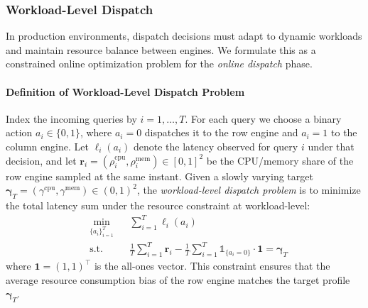 \documentclass[sigconf, nonacm]{acmart}
\begin{document}



\subsubsection{Workload-Level Dispatch}\label{sssec:online_dispatch}
In production environments, dispatch decisions must adapt to dynamic workloads and maintain resource balance between engines. We formulate this as a constrained online optimization problem for the \textit{online dispatch} phase.


\paragraph{Definition of Workload-Level Dispatch Problem}
Index the incoming queries by $i=1,\dots,T$. For each query we choose a binary action $a_i\in\{0,1\}$, where $a_i=0$ dispatches it to the row engine and $a_i=1$ to the column engine. Let $\ell_i(a_i)$ denote the latency observed for query $i$ under that decision, and let $\mathbf{r}_i=(\rho_i^{\text{cpu}},\rho_i^{\text{mem}})\in[0,1]^2$ be the CPU/memory share of the row engine sampled at the same instant. Given a slowly varying target $\boldsymbol{\gamma}_T=(\gamma^{\text{cpu}},\gamma^{\text{mem}})\in(0,1)^2$, the \emph{workload-level dispatch problem} is to minimize the total latency sum under the resource constraint at workload-level:
\begin{equation}
\begin{aligned}
  &\min_{\{a_i\}_{i=1}^T}
   &&\sum_{i=1}^{T}\ell_i(a_i)\\
  &\text{s.t.}
   &&\frac{1}{T}\sum_{i=1}^T\mathbf{r}_i
      -\frac{1}{T}\sum_{i=1}^T
        \mathds{1}_{\{a_i=0\}} \cdot \mathbf{1}
      =\boldsymbol{\gamma}_T
\end{aligned}
\label{eq:online_obj_query}
\end{equation}
where $\mathbf{1}=(1,1)^\top$ is the all-ones vector. This constraint ensures that the average resource consumption bias of the row engine matches the target profile $\boldsymbol{\gamma}_T$.
\end{document}
